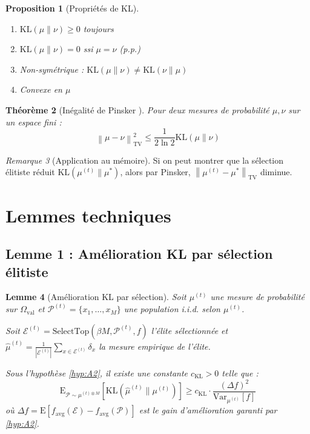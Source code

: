 \documentclass[12pt,a4paper]{article}
\newtheorem{theorem}{Théorème}[section]
\newtheorem{lemma}[theorem]{Lemme}
\newtheorem{proposition}[theorem]{Proposition}
\theoremstyle{definition}
\theoremstyle{remark}
\newtheorem{remark}[theorem]{Remarque}
\newcommand{\E}{\text{E}}
\newcommand{\Var}{\text{Var}}
\newcommand{\KL}{\text{KL}}
\newcommand{\TV}{\text{TV}}
\newcommand{\norm}[1]{\left\|#1\right\|}
\begin{document}
	\begin{proposition}[Propriétés de KL]
		\begin{enumerate}
			\item $\KL(\mu\|\nu) \geq 0$ toujours
			\item $\KL(\mu\|\nu) = 0$ ssi $\mu = \nu$ (p.p.)
			\item Non-symétrique : $\KL(\mu\|\nu) \neq \KL(\nu\|\mu)$
			\item Convexe en $\mu$
		\end{enumerate}
	\end{proposition}
	
	\begin{theorem}[Inégalité de Pinsker \cite{cover2006elements}]\label{thm:pinsker}
		Pour deux mesures de probabilité $\mu, \nu$ sur un espace fini :
		\begin{equation}
			\norm{\mu - \nu}_{\TV}^2 \leq \frac{1}{2\ln 2} \KL(\mu\|\nu)
		\end{equation}
	\end{theorem}
	
	\begin{remark}[Application au mémoire]
		Si on peut montrer que la sélection élitiste réduit $\KL(\mu^{(t)}\|\mu^*)$, alors par Pinsker, $\norm{\mu^{(t)} - \mu^*}_{\TV}$ diminue.
	\end{remark}
	
	\section{Lemmes techniques}
	
	\subsection{Lemme 1 : Amélioration KL par sélection élitiste}
	
	\begin{lemma}[Amélioration KL par sélection]\label{lem:kl-selection}
		Soit $\mu^{(t)}$ une mesure de probabilité sur $\Omega_{\text{val}}$ et $\mathcal{P}^{(t)} = \{x_1, \ldots, x_M\}$ une population i.i.d. selon $\mu^{(t)}$.
		
		Soit $\mathcal{E}^{(t)} = \text{SelectTop}(\beta M, \mathcal{P}^{(t)}, f)$ l'élite sélectionnée et $\hat{\mu}^{(t)} = \frac{1}{|\mathcal{E}^{(t)}|}\sum_{x\in\mathcal{E}^{(t)}} \delta_x$ la mesure empirique de l'élite.
		
		Sous l'hypothèse \ref{hyp:A2}, il existe une constante $c_{\KL} > 0$ telle que :
		\begin{equation}
			\E_{\mathcal{P}\sim\mu^{(t)\otimes M}}\left[\KL(\hat{\mu}^{(t)}\|\mu^{(t)})\right] \geq c_{\KL} \cdot \frac{(\Delta f)^2}{\Var_{\mu^{(t)}}[f]}
		\end{equation}
		où $\Delta f = \E[f_{\text{avg}}(\mathcal{E}) - f_{\text{avg}}(\mathcal{P})]$ est le gain d'amélioration garanti par \ref{hyp:A2}.
	\end{lemma}
	
\end{document}
